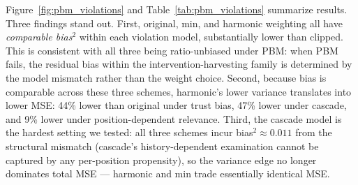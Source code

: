 \documentclass[sigconf]{acmart}
\begin{document}
Figure~\ref{fig:pbm_violations} and Table~\ref{tab:pbm_violations} summarize results. Three findings stand out. First, original, min, and harmonic weighting all have \emph{comparable bias$^2$} within each violation model, substantially lower than clipped. This is consistent with all three being ratio-unbiased under PBM: when PBM fails, the residual bias within the intervention-harvesting family is determined by the model mismatch rather than the weight choice. Second, because bias is comparable across these three schemes, harmonic's lower variance translates into lower MSE: 44\% lower than original under trust bias, 47\% lower under cascade, and 9\% lower under position-dependent relevance. Third, the cascade model is the hardest setting we tested: all three schemes incur bias$^2 \approx 0.011$ from the structural mismatch (cascade's history-dependent examination cannot be captured by any per-position propensity), so the variance edge no longer dominates total MSE — harmonic and min trade essentially identical MSE.
\end{document}
